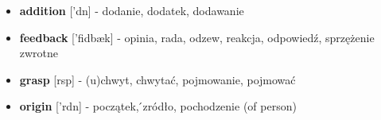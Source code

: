 \documentclass[a4paper,12pt]{article}
\begin{document}
\begin{itemize}
\item{\textbf{addition }}[\textschwa'd\textsci\textesh\textschwa n] - dodanie, dodatek, dodawanie
\item{\textbf{feedback }}['fi\textlengthmark db\ae k] - opinia, rada, odzew, reakcja, odpowiedź, sprzężenie zwrotne
\item{\textbf{grasp }}[\textscriptg r\textscripta\textlengthmark sp] - (u)chwyt, chwytać, pojmowanie, pojmować
\item{\textbf{origin }} ['\textopeno r\textsci d\textyogh\textsci n] - początek, ́zródło, pochodzenie (of person)
\end{itemize}
\end{document}
